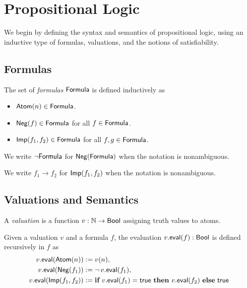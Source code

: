\chapter{Propositional Logic}

We begin by defining the syntax and semantics of propositional logic, using an inductive type
of formulas, valuations, and the notions of satisfiability.

\section{Formulas}

\begin{definition}
    \label{Formula}
    \leanok
    The set of \emph{formulas} $\mathsf{Formula}$ is defined inductively as
    \begin{itemize}
        \item $\mathsf{Atom}(n) \in \mathsf{Formula}$.
        \item $\mathsf{Neg}(f) \in \mathsf{Formula}$ for all $f \in \mathsf{Formula}$.
        \item $\mathsf{Imp}(f_1, f_2) \in \mathsf{Formula}$ for all $f, g \in \mathsf{Formula}$.
    \end{itemize}

\end{definition}

\begin{notation}
    \label{neg_notation}
    We write $\neg \mathsf{Formula}$ for $\mathsf{Neg}(\mathsf{Formula})$ when the notation is nonambiguous.
\end{notation}

\begin{notation}
    \label{imp_notation}
    We write $f_1 \to f_2$ for $\mathsf{Imp}(f_1, f_2)$ when the notation is nonambiguous.
\end{notation}

\section{Valuations and Semantics}

\begin{definition}
    \label{Valuation}
    \leanok
    A \emph{valuation} is a function $v : \mathbb{N} \to \mathsf{Bool}$ assigning truth values to atoms.
\end{definition}

\begin{definition}
    \label{Valuation.eval}
    \leanok
    Given a valuation $v$ and a formula $f$, the evaluation $v.\mathsf{eval}(f) : \mathsf{Bool}$ is defined recursively in $f$ as
    \[
    \begin{aligned}
        v.\mathsf{eval}(\mathsf{Atom}(n)) &:= v(n), \\
        v.\mathsf{eval}(\mathsf{Neg}(f_1)) &:= \neg \, v.\mathsf{eval}(f_1), \\
        v.\mathsf{eval}(\mathsf{Imp}(f_1, f_2)) &:= \textbf{if}\ v.\mathsf{eval}(f_1) = \mathsf{true}\ \textbf{then}\ v.\mathsf{eval}(f_2)\ \textbf{else}\ \mathsf{true}
    \end{aligned}
    \]
\end{definition}

